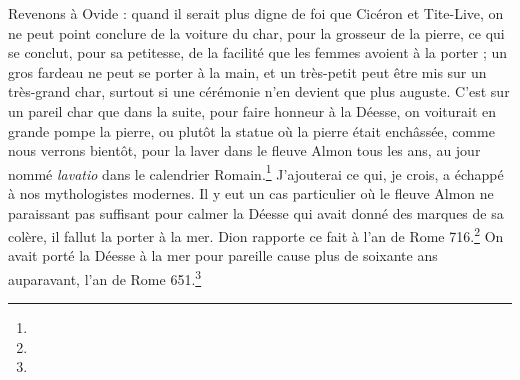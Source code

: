 \documentclass[a4paper, 11pt, oneside, polutonikogreek, french]{article}
\begin{document}
Revenons à Ovide : quand il serait plus digne de foi que Cicéron et Tite-Live, on ne peut point conclure de la voiture du char, pour la grosseur de la pierre, ce qui se conclut, pour sa petitesse, de la facilité que les femmes avoient à la porter ; un gros fardeau ne peut se porter à la main, et un très-petit peut être mis sur un très-grand char, surtout si une cérémonie n'en devient que plus auguste. C'est sur un pareil char que dans la suite, pour faire honneur à la Déesse, on voiturait en grande pompe la pierre, ou plutôt la statue où la pierre était enchâssée, comme nous verrons bientôt, pour la laver dans le fleuve Almon tous les ans, au jour nommé \emph{lavatio} dans le calendrier Romain.\footnote{} J'ajouterai ce qui, je crois, a échappé à nos mythologistes modernes. Il y eut un cas particulier où le fleuve Almon ne paraissant pas suffisant pour calmer la Déesse qui avait donné des marques de sa colère, il fallut la porter à la mer. Dion rapporte ce fait à l'an de Rome 716.\footnote{} On avait porté la Déesse à la mer pour pareille cause plus de soixante ans auparavant, l'an de Rome 651.\footnote{}
\end{document}
